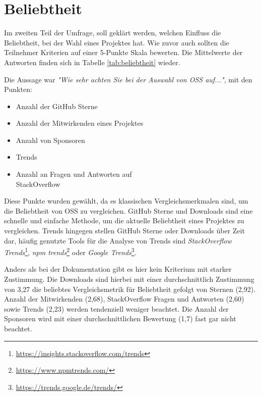 \cleardoublepage %

\section{Beliebtheit}\label{sec:Beliebtheit}
Im zweiten Teil der Umfrage, soll geklärt werden, welchen Einfluss die Beliebtheit, bei der Wahl
eines Projektes hat. Wie zuvor auch sollten die Teilnehmer Kriterien auf einer 5-Punkte Skala bewerten.
Die Mittelwerte der Antworten finden sich in Tabelle \ref{tab:beliebtheit} wieder.

\bigskip
\noindent
Die Aussage war \textit{"Wie sehr achten Sie bei der Auswahl von OSS auf..."}, mit den Punkten:
\begin{multicols}{2}
    \begin{itemize}
        \setlength\itemsep{0em}
        \item Anzahl der GitHub Sterne
        \item Anzahl der Mitwirkenden eines
              Projektes
        \item Anzahl von Sponsoren
        \item Trends
        \item Anzahl an Fragen und Antworten auf\\ StackOverflow
    \end{itemize}
\end{multicols}

\noindent
Diese Punkte wurden gewählt, da es klassischen Vergleichsmerkmalen sind, um die Beliebtheit von OSS
zu vergleichen. GitHub Sterne und Downloads sind eine schnelle und einfache Methode, um die aktuelle 
Beliebtheit eines Projektes zu vergleichen. Trends hingegen stellen GitHub Sterne oder Downloads 
über Zeit dar, häufig genutzte Tools für die Analyse von Trends sind
\textit{StackOverflow Trends}\footnote{\url{https://insights.stackoverflow.com/trends}},
\textit{npm trends}\footnote{\url{https://www.npmtrends.com/}} oder
\textit{Google Trends}\footnote{\url{https://trends.google.de/trends/}}.


Anders als bei der Dokumentation gibt es hier kein Kriterium mit starker Zustimmung. Die Downloads
sind hierbei mit einer durchschnittlich Zustimmung von 3,27 die beliebtes Vergleichsmetrik für Beliebtheit
gefolgt von Sternen (2,92). Anzahl der Mitwirkenden (2,68), StackOverflow Fragen und Antworten (2,60) sowie 
Trends (2,23) werden tendenziell weniger beachtet. Die Anzahl der Sponsoren wird mit einer durchschnittlichen
Bewertung (1,7) fast gar nicht beachtet. 



